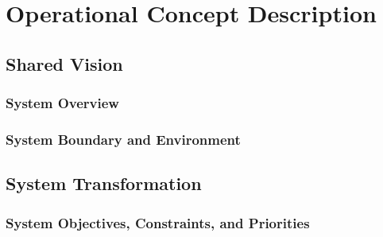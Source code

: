 \section{Operational Concept Description}


\subsection{Shared Vision}

	\subsubsection{System Overview}\begin{multicols}{2}
		
	\end{multicols}
 	\newpage

 	\subsubsection{System Boundary and Environment}
 	\newpage
 		
\subsection{System Transformation}
	\subsubsection{System Objectives, Constraints, and Priorities}
		
	\newpage
	
